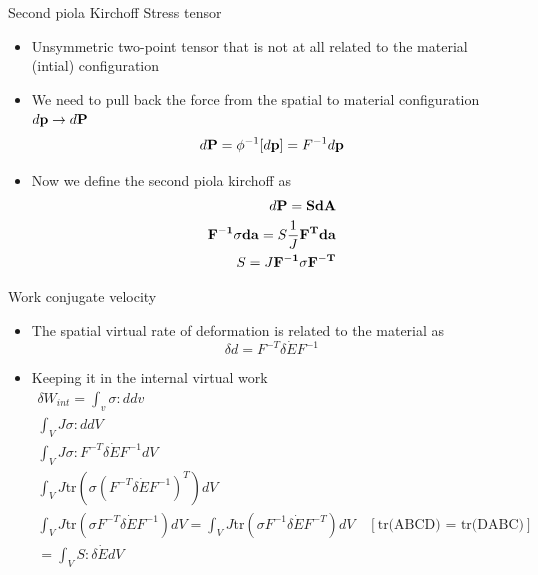 	
	\begin{frame}{Second piola Kirchoff Stress tensor}
		\begin{itemize}
			\item Unsymmetric two-point tensor that is not at all related to the material (intial) configuration
			\item We need to pull back the force from the spatial to material configuration $d\mathbf{p} \rightarrow d\mathbf{P}$
			\begin{equation}
				d\mathbf{P} = \phi^{-1}[d\mathbf{p}] =  F^{-1}d\mathbf{p}
			\end{equation}
			\item Now we define the second piola kirchoff as 
			\begin{equation}
			\begin{aligned}
			d\mathbf{P = SdA} \\
			\mathbf{F^{-1}\sigma da} = S \frac{1}{J} \mathbf{F^{T} da}  \\
			S = J \mathbf{F^{-1}\sigma F^{-T}}
			\end{aligned}
			\end{equation}
		\end{itemize}
	\end{frame}


	\begin{frame}{Work conjugate velocity}
		\begin{itemize}
			\item The spatial virtual rate of deformation
			is related to the material as
			\begin{equation}
				\delta d = F^{-T} \delta \dot{E} F^{-1}
			\end{equation}
			\item Keeping it in the internal virtual work
			\begin{equation}
			\begin{aligned}
			\delta W_{int} = \int_v \sigma : d dv\\
			\int_V J\sigma : d dV \\
			\int_V J\sigma : F^{-T} \delta \dot{E} F^{-1} dV \\
			\int_V J \text{tr}(\sigma  (F^{-T} \delta \dot{E} F^{-1})^T) dV \\
			\int_V J \text{tr}(\sigma  F^{-T} \delta \dot{E} F^{-1}) dV  = \int_V J \text{tr}(\sigma  F^{-1} \delta \dot{E} F^{-T}) dV  \quad  [\text{tr(ABCD) = tr(DABC)}] \\
			=\int_V S:\delta \dot{E} dV
			\end{aligned}
			\end{equation}
		\end{itemize}
	\end{frame}



